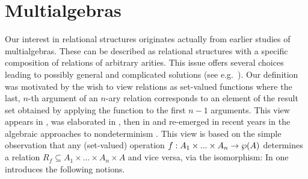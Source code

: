 \documentclass[10pt]{article}
\begin{document}

\section{Multialgebras}
\label{se:mult}
Our interest in relational structures originates actually from earlier studies
of multialgebras. These can be described as relational structures with
a specific composition
of relations of arbitrary arities. This issue offers several
choices leading to possibly general and complicated solutions (see
e.g.\ \cite{glenn,Topen:93}).  Our definition  was motivated by
the wish to view relations as set-valued functions where the last,
$n$-th argument of an $n$-ary relation corresponds to an element of
the result set obtained by applying the function to the first $n-1$
arguments.  This view appears in \cite{c:101}, was elaborated in
\cite{JT1,JT2}, then in \cite{c:102} and re-emerged in recent years in
the algebraic approaches to nondeterminism
\cite{c:64,c:59,c:Bia1,c:130,survey}.  This view is based on the
simple observation that any (set-valued) operation
$f:A_1\times...\times A_n\rightarrow \wp(A)$ determines a relation
$R_f\subseteq A_1\times...\times A_n\times A$ and vice versa, via the
isomorphism: 
%
%
In \cite{JT1,BJ} one introduces the following notions.
\end{document}
